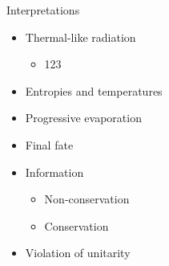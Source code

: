 \documentclass{beamer}
\begin{document}
\begin{frame}{Interpretations}%
\begin{itemize}
\item Thermal-like radiation
	\begin{itemize}
	\item 123
	\end{itemize}

\item Entropies and temperatures
\item Progressive evaporation
\item Final fate
\item Information
	\begin{itemize}
	\item Non-conservation \cite{Hawking1976}
	\item Conservation \cite{Page1993}
	\end{itemize}
\item Violation of unitarity
\end{itemize}

\end{frame}










\end{document}
